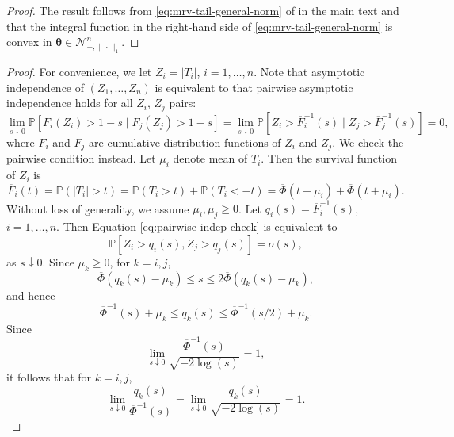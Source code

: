 \documentclass[12pt]{article}
\theoremstyle{plain}
\theoremstyle{plain}
\theoremstyle{definition}
\renewcommand{\Pr}{\mathbb{P}}
\begin{document}
\QVSH*
\begin{proof}
The result follows from \eqref{eq:mrv-tail-general-norm} of  in the main text %
and that the integral function  in the right-hand side of  \eqref{eq:mrv-tail-general-norm} is convex in $\boldsymbol{\theta}\in\mathcal N_{+,\|\cdot\|_1}^n.$
\end{proof}

\AbsoluteGauss*
\begin{proof}
For convenience, we let $Z_i=|T_i|$, $i=1,\dots,n$.
Note that asymptotic independence of $(Z_1,\dots,Z_n)$ is equivalent to that pairwise asymptotic independence holds for all $Z_i$, $Z_j$ pairs:
\begin{equation}
\label{eq:pairwise-indep-check}
\lim_{s\downarrow0}\Pr[F_i(Z_i)>1-s\mid F_j(Z_j)>1-s]
=\lim_{s\downarrow0}\Pr[Z_i > \overline{F}_i^{-1}(s)\mid Z_j > \overline{F}_j^{-1}(s)]
=0,
\end{equation}
where $F_i$ and $F_j$ are cumulative distribution functions of $Z_i$ and $Z_j$.
We check the pairwise condition instead. Let $\mu_i$ denote mean of $T_i$. Then the survival function of $Z_i$ is
\[
\overline{F}_i(t) = \Pr(|T_i|> t)
=\Pr(T_i> t)+\Pr(T_i<- t)
=\overline{\Phi}(t-\mu_i)+\overline{\Phi}(t+\mu_i).
\]
Without loss of generality, we assume $\mu_i,\mu_j\ge0$. 
Let $q_i(s)=\overline{F}_i^{-1}(s)$, $i=1,\dots,n$. Then Equation \eqref{eq:pairwise-indep-check} is equivalent to
\[
\Pr\left[Z_i > q_i(s),Z_j > q_j(s)\right] = o(s),
\]
as $s\downarrow0$.
Since $\mu_k\ge 0$, for $k=i,j$,
\[
\overline{\Phi}(q_k(s)-\mu_k)
\le s
\le 2\overline{\Phi}(q_k(s)-\mu_k),
\]
and hence
\[
\overline{\Phi}^{-1}(s)+\mu_k\le q_k(s)\le \overline{\Phi}^{-1}(s/2)+\mu_k.
\]
Since
\[
\lim_{s\downarrow0}\frac{\overline{\Phi}^{-1}(s)}{\sqrt{-2\log(s)}}=1,
\]
it follows that for $k=i,j$,
\begin{equation}
\label{eq:qk-order}
\lim_{s\downarrow0}\frac{q_k(s)}{\overline{\Phi}^{-1}(s)}
=\lim_{s\downarrow0}\frac{q_k(s)}{\sqrt{-2\log(s)}}
=1.
\end{equation}


\end{proof}
\end{document}
